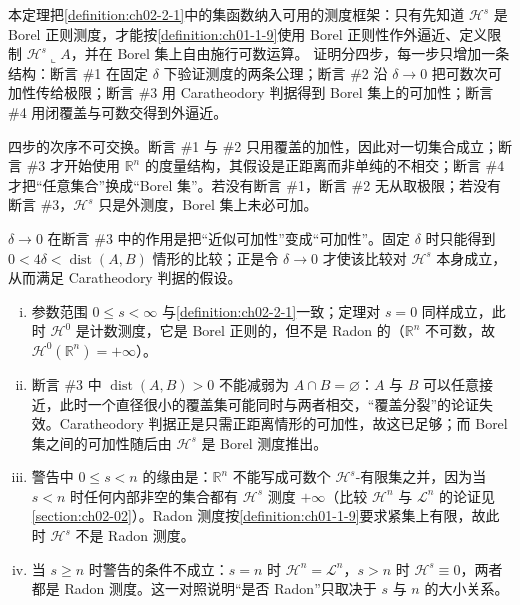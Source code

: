 \documentclass[../../main.tex]{subfiles}%
\begin{document}
\begin{remark}\label{remark:ch02-thm-2-1-动机}
本定理把\cref{definition:ch02-2-1}中的集函数纳入可用的测度框架：只有先知道 $\mathcal{H}^s$ 是 Borel 正则测度，才能按\cref{definition:ch01-1-9}使用 Borel 正则性作外逼近、定义限制 $\mathcal{H}^s\llcorner A$，并在 Borel 集上自由施行可数运算。%
证明分四步，每一步只增加一条结构：断言 \#1 在固定 $\delta$ 下验证测度的两条公理；断言 \#2 沿 $\delta\to0$ 把可数次可加性传给极限；断言 \#3 用 Caratheodory 判据得到 Borel 集上的可加性；断言 \#4 用闭覆盖与可数交得到外逼近。

四步的次序不可交换。断言 \#1 与 \#2 只用覆盖的加性，因此对一切集合成立；断言 \#3 才开始使用 $\mathbb{R}^n$ 的度量结构，其假设是正距离而非单纯的不相交；断言 \#4 才把“任意集合”换成“Borel 集”。若没有断言 \#1，断言 \#2 无从取极限；若没有断言 \#3，$\mathcal{H}^s$ 只是外测度，Borel 集上未必可加。

$\delta\to0$ 在断言 \#3 中的作用是把“近似可加性”变成“可加性”。固定 $\delta$ 时只能得到 $0<4\delta<\operatorname{dist}(A,B)$ 情形的比较；正是令 $\delta\to0$ 才使该比较对 $\mathcal{H}^s$ 本身成立，从而满足 Caratheodory 判据的假设。
\end{remark}

\begin{remark}\label{remark:ch02-thm-2-1-条件}
\begin{enumerate}[(i)]
\item 参数范围 $0\leqslant s<\infty$ 与\cref{definition:ch02-2-1}一致；定理对 $s=0$ 同样成立，此时 $\mathcal{H}^0$ 是计数测度，它是 Borel 正则的，但不是 Radon 的（$\mathbb{R}^n$ 不可数，故 $\mathcal{H}^0(\mathbb{R}^n)=+\infty$）。%
\item 断言 \#3 中 $\operatorname{dist}(A,B)>0$ 不能减弱为 $A\cap B=\varnothing$：$A$ 与 $B$ 可以任意接近，此时一个直径很小的覆盖集可能同时与两者相交，“覆盖分裂”的论证失效。Caratheodory 判据正是只需正距离情形的可加性，故这已足够；而 Borel 集之间的可加性随后由 $\mathcal{H}^s$ 是 Borel 测度推出。
\item 警告中 $0\leqslant s<n$ 的缘由是：$\mathbb{R}^n$ 不能写成可数个 $\mathcal{H}^s$-有限集之并，因为当 $s<n$ 时任何内部非空的集合都有 $\mathcal{H}^s$ 测度 $+\infty$（比较 $\mathcal{H}^n$ 与 $\mathcal{L}^n$ 的论证见\cref{section:ch02-02}）。Radon 测度按\cref{definition:ch01-1-9}要求紧集上有限，故此时 $\mathcal{H}^s$ 不是 Radon 测度。%
\item 当 $s\geqslant n$ 时警告的条件不成立：$s=n$ 时 $\mathcal{H}^n=\mathcal{L}^n$，$s>n$ 时 $\mathcal{H}^s\equiv0$，两者都是 Radon 测度。这一对照说明“是否 Radon”只取决于 $s$ 与 $n$ 的大小关系。
\end{enumerate}
\end{remark}
\end{document}
